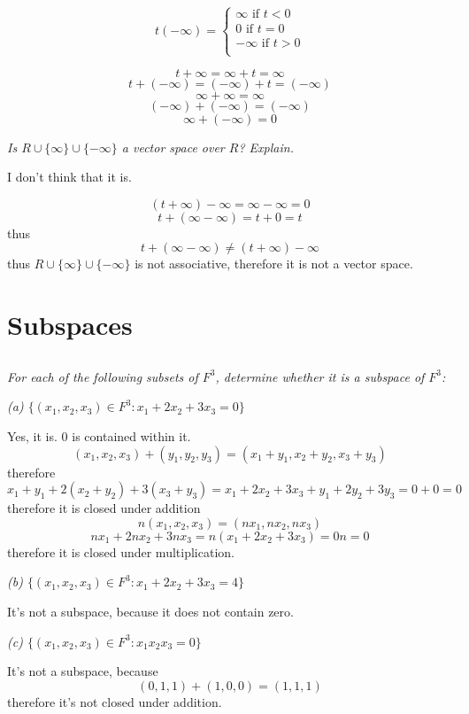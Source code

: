 \documentclass[11pt,oneside,titlepage]{book}
\begin{document}
$$
t(-\infty) =
\begin{cases}
  \infty \text{ if } t < 0 \\
  0 \text{ if } t = 0 \\
  -\infty \text{ if } t > 0 \\
\end{cases}
$$

$$t + \infty = \infty + t = \infty$$
$$t + (-\infty) = (-\infty) + t = (-\infty)$$
$$\infty + \infty = \infty$$
$$(-\infty) + (-\infty) = (-\infty)$$
$$\infty + (-\infty) = 0$$

\textit{Is $R \cup \{\infty\} \cup \{-\infty\}$ a vector space over
  $R$? Explain.}

I don't think that it is.

$$(t + \infty) - \infty = \infty - \infty = 0$$
$$t + (\infty - \infty) = t + 0 = t$$
thus
$$t + (\infty - \infty) \neq (t + \infty) - \infty$$
thus 
$R \cup \{\infty\} \cup \{-\infty\}$ is not associative, therefore it is
not a vector space.

\section{Subspaces}

\subsection{}
\textit{For each of the following subsets of $F^3$, determine whether it is a
  subspace of $F^3$:}

\textit{(a) $\{(x_1, x_2, x_3) \in F^3: x_1 + 2x_2 + 3x_3 = 0\}$}

Yes, it is. $0$ is contained within it.
$$(x_1, x_2, x_3) + (y_1, y_2, y_3) = (x_1 + y_1, x_2 + y_2, x_3 + y_3)$$
therefore
$$x_1 + y_1 + 2(x_2 + y_2) +  3(x_3 + y_3) =
x_1 + 2x_2 + 3x_3 + y_1 + 2y_2 + 3y_3 = 0+ 0 = 0$$
therefore it is closed under addition
$$n(x_1, x_2, x_3) = (nx_1, nx_2, nx_3)$$
$$nx_1 + 2nx_2 + 3nx_3 = n(x_1 + 2x_2 + 3x_3 ) = 0n = 0$$
therefore it is closed under multiplication.

\textit{(b) $\{(x_1, x_2, x_3) \in F^3: x_1 + 2x_2 + 3x_3 = 4\}$}

It's not a subspace, because it does not contain zero.


\textit{(c) $\{(x_1, x_2, x_3) \in F^3: x_1 x_2 x_3 = 0\}$}

It's not a subspace, because
$$(0, 1, 1) + (1, 0, 0) = (1, 1, 1)$$
therefore it's not closed under addition.
\end{document}
